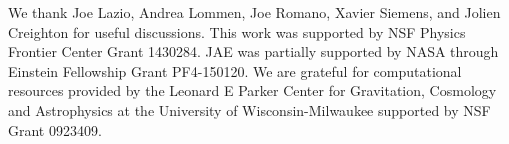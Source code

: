 \documentclass[twocolumn,aps,prd,superscriptaddress]{revtex4-1}
\begin{document}
\acknowledgments
We thank Joe Lazio, Andrea Lommen, Joe Romano, Xavier Siemens, 
and Jolien Creighton for useful discussions. 
This work was supported by NSF Physics Frontier Center Grant 1430284. 
JAE was partially supported by NASA through Einstein Fellowship Grant PF4-150120. 
We are grateful for computational resources provided by the Leonard E Parker
Center for Gravitation, Cosmology and Astrophysics at the University of
Wisconsin-Milwaukee supported by NSF Grant 0923409.




\end{document}
